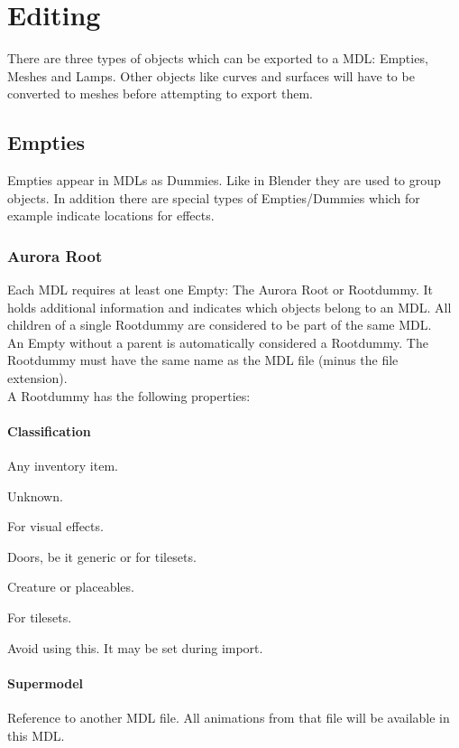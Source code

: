 \chapter{Editing}
There are three types of objects which can be exported to a MDL: Empties,
Meshes and Lamps. Other objects like curves and surfaces will have to be
converted to meshes before attempting to export them.

\section{Empties}
Empties appear in MDLs as Dummies. Like in Blender they are used to group
objects. In addition there are special types of Empties/Dummies which for
example indicate locations for effects.

\subsection{Aurora Root}
Each MDL requires at least one Empty: The Aurora Root or Rootdummy. It holds 
additional information and indicates which objects belong to an MDL. All children
of a single Rootdummy are considered to be part of the same MDL. \\

An Empty without a parent is automatically considered a Rootdummy. 
The Rootdummy must have the same name as the MDL file (minus the file extension). \\

A Rootdummy has the following properties:
\subsubsection*{Classification}
\begin{description}[leftmargin=6em,style=nextline]
    \item[Item] Any inventory item.
    \item[GUI] Unknown.
    \item[Effect] For visual effects.
    \item[Door] Doors, be it generic or for tilesets.
    \item[Character] Creature or placeables. 
    \item[Tile] For tilesets.
    \item[Unknown] Avoid using this. It may be set during import.
\end{description}

\subsubsection*{Supermodel}
Reference to another MDL file. All animations from that file 
will be available in this MDL.


